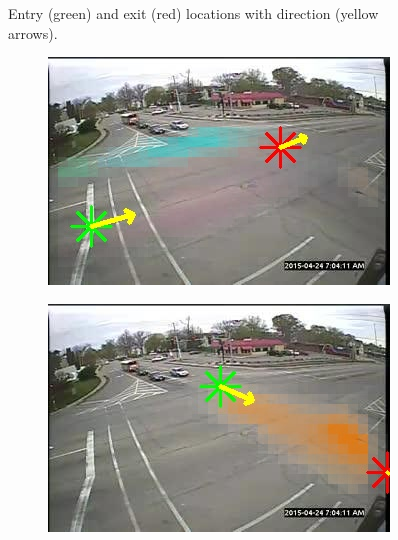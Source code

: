 \begin{figure}[!h]
\begin{subfigure}{0.32\linewidth}
        \end{subfigure}
        \caption{Entry (green) and exit (red) locations with direction (yellow arrows).}
        \label{fig:entry-exit-full-1}
\end{figure}
\begin{figure}[!h]
    \centering
        \begin{subfigure}{0.32\linewidth}
            \includegraphics[width=\linewidth]{./img/scene_learning/res/230955/230955-0.jpg}
        \end{subfigure}
        \begin{subfigure}{0.32\linewidth}
            \includegraphics[width=\linewidth]{./img/scene_learning/res/230955/230955-1.jpg}
        \end{subfigure}
        \begin{subfigure}{0.32\linewidth}

\end{subfigure}
\end{figure}
